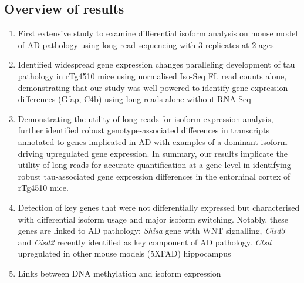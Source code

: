 \subsection{Overview of results}
\begin{enumerate}
	\item First extensive study to examine differential isoform analysis on mouse model of AD pathology using long-read sequencing with 3 replicates at 2 ages 
	\item Identified widespread gene expression changes paralleling development of tau pathology in rTg4510 mice using normalised Iso-Seq FL read counts alone, demonstrating that our study was well powered to identify gene expression differences (Gfap, C4b) using long reads alone without RNA-Seq
	\item Demonstrating the utility of long reads for isoform expression analysis, further identified robust genotype-associated differences in transcripts annotated to genes implicated in AD with examples of a dominant isoform driving upregulated gene expression. In summary, our results implicate the utility of long-reads for accurate quantification at a gene-level in identifying robust tau-associated gene expression differences in the entorhinal cortex of rTg4510 mice. 
	\item Detection of key genes that were not differentially expressed but characterised with differential isoform usage and major isoform switching. Notably, these genes are linked to AD pathology: \textit{Shisa} gene with WNT signalling, \textit{Cisd3} and \textit{Cisd2} recently identified as key component of AD pathology. \textit{Ctsd} upregulated in other mouse models (5XFAD) hippocampus %
	\item Links between DNA methylation and isoform expression 	
\end{enumerate}

